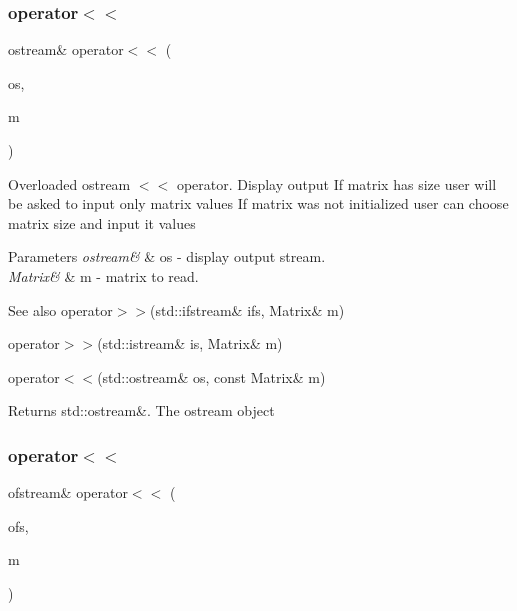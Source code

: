 \subsubsection{\texorpdfstring{operator$<$$<$}{operator<<}\hspace{0.1cm}{\footnotesize\ttfamily [1/2]}}
{\footnotesize\ttfamily ostream\& operator$<$$<$ (\begin{DoxyParamCaption}\item[{ostream \&}]{os,  }\item[{const \mbox{\hyperlink{class_matrix}{Matrix}} \&}]{m }\end{DoxyParamCaption})\hspace{0.3cm}{\ttfamily [friend]}}

Overloaded ostream $<$$<$ operator. Display output If matrix has size user will be asked to input only matrix values If matrix was not initialized user can choose matrix size and input it values 
\begin{DoxyParams}{Parameters}
{\em ostream\&} & os -\/ display output stream. \\
\hline
{\em Matrix\&} & m -\/ matrix to read. \\
\hline
\end{DoxyParams}
\begin{DoxySeeAlso}{See also}
operator$>$$>$(std\+::ifstream\& ifs, Matrix\& m) 

operator$>$$>$(std\+::istream\& is, Matrix\& m) 

operator$<$$<$(std\+::ostream\& os, const Matrix\& m) 
\end{DoxySeeAlso}
\begin{DoxyReturn}{Returns}
std\+::ostream\&. The ostream object 
\end{DoxyReturn}
\mbox{\label{class_matrix_ae0b243a10c750750eb00e9af787ea4b8}} 
\subsubsection{\texorpdfstring{operator$<$$<$}{operator<<}\hspace{0.1cm}{\footnotesize\ttfamily [2/2]}}
{\footnotesize\ttfamily ofstream\& operator$<$$<$ (\begin{DoxyParamCaption}\item[{ofstream \&}]{ofs,  }\item[{const \mbox{\hyperlink{class_matrix}{Matrix}} \&}]{m }\end{DoxyParamCaption})\hspace{0.3cm}{\ttfamily [friend]}}

